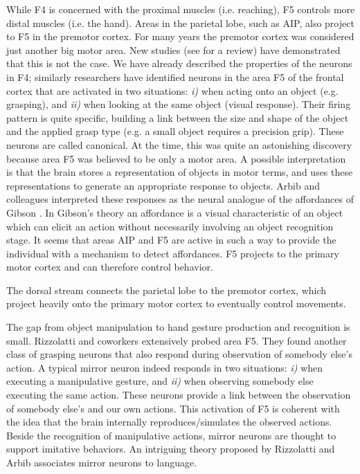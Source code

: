 While F4 is concerned with the proximal muscles (i.e. reaching), F5
controls more distal muscles (i.e. the hand). Areas in the parietal 
lobe, such as AIP, also project to F5 in the premotor cortex.
For many years the premotor cortex was considered
just another big motor area. New studies (see \cite{jeannerod97cognitive} for a review) 
have demonstrated that this is not the case. We have already described the
properties of the neurons in F4; similarly researchers have 
identified neurons in the area F5 of the frontal cortex \cite{fadiga00visuomotor} 
that are activated in two situations: {\it i)} when acting onto an object 
(e.g. grasping), and {\it ii)} when looking at the same object (visual response). 
Their firing pattern is quite specific, building a link between the size 
and shape of the object and the applied grasp type (e.g. a small object 
requires a precision grip). These neurons are called canonical. At the time,
this was quite an astonishing discovery because area F5 was believed 
to be only a motor area. A possible interpretation is that the brain 
stores a representation of objects in motor terms, and uses these 
representations to generate an appropriate response to objects. 
Arbib and colleagues \cite{fagg-arbib-1998} interpreted
these responses as the neural analogue of the affordances of Gibson 
\cite{gibson77theory}. In Gibson's theory an affordance is a visual
characteristic of an object which can elicit an action without necessarily
involving an object recognition stage. It seems that areas AIP and F5 are 
active in such a way to provide the individual with a mechanism to 
detect affordances. F5 projects to the primary motor cortex and can 
therefore control behavior.

\ifverbose
The dorsal stream connects the parietal lobe to the premotor cortex,
which project heavily onto the primary motor cortex to eventually
control movements.
\fi

The gap from object manipulation to hand gesture production and 
recognition is small.
Rizzolatti and coworkers \cite{gallese-fadiga-fogassi-rizzolatti-1996}
extensively probed area F5. They found another class of grasping
neurons that also respond during observation of somebody else's action.
A typical mirror neuron indeed responds in two
situations: {\it i)} when executing a manipulative gesture, and {\it
ii)} when observing somebody else executing the same action. These
neurons provide a link between the observation of somebody else's
and our own actions. This activation of F5 is coherent with the idea
that the brain internally reproduces/simulates the observed actions.
Beside the recognition of manipulative actions, mirror neurons are 
thought to support imitative behaviors. An intriguing theory
proposed by Rizzolatti and Arbib \cite{rizzolatti98language}
associates mirror neurons to language.

